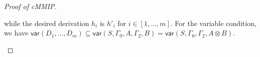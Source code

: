 \documentclass[sn-mathphys-num]{sn-jnl}%
\newcommand{\GG}{\Gamma}
\newcommand{\GD}{\Delta}
\newcommand{\GL}{\Lambda}
\newcommand{\GO}{\Omega}
\newcommand{\vd}{\vdash}
\newcommand{\tr}{\otimes\mathsf{R}}
\newcommand{\ot}{\otimes}
\newcommand{\lolli}{\multimap}
\newcommand{\lleft}{{\lolli}\mathsf{L}}
\newcommand{\mf}[1]{\mathsf{#1}}
\newcommand{\gs}[1]{\sigma_{X} (#1)}
\newcommand{\vars}[1]{\mf{var} (#1)}
\newcommand{\cMMIP}{\textsf{cMMIP}}
\theoremstyle{thmstyleone}%
\theoremstyle{thmstyletwo}%
\newtheorem{lemma}[theorem]{Lemma}
\theoremstyle{thmstylethree}%
\begin{document}
\begin{proof}[Proof of \cMMIP]
\begin{itemize}
\begin{displaymath}
{      }
    \end{displaymath}
    while the desired derivation $h_i$ is $h'_i$ for $i \in [1,\dots,m]$.
    For the variable condition, we have
    $\vars{D_1,\dots,D_m} \subseteq \vars{S, \GG_0 , A , \GG_2 , B} = \vars{S , \GG_0 , \GG_2 , A \ot B}$.
  \end{itemize}
\end{proof}
\end{document}
